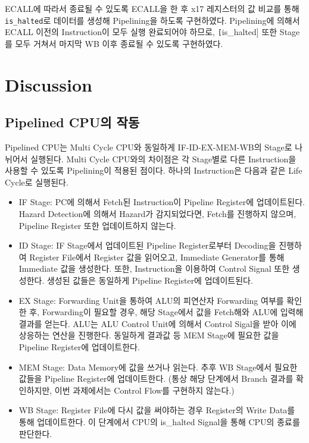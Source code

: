 \documentclass[openright, a4paper]{article}
\newcommand{\code}[1]{\texttt{#1}}
\begin{document}
ECALL에 따라서 종료될 수 있도록 ECALL을 한 후 x17 레지스터의 값 비교를 통해 \code{is_halted}로 데이터를 생성해 Pipelining을 하도록 구현하였다. Pipelining에 의해서 ECALL 이전의 Instruction이 모두 실행 완료되어야 하므로, \code[is_halted] 또한 Stage를 모두 거쳐서 마지막 WB 이후 종료될 수 있도록 구현하였다.


\section{Discussion}

\subsection{Pipelined CPU의 작동}

Pipelined CPU는 Multi Cycle CPU와 동일하게 IF-ID-EX-MEM-WB의 Stage로 나뉘어서 실행된다. Multi Cycle CPU와의 차이점은 각 Stage별로 다른 Instruction을 사용할 수 있도록 Pipelining이 적용된 점이다. 하나의 Instruction은 다음과 같은 Life Cycle로 실행된다.

\begin{itemize}
    \item IF Stage: PC에 의해서 Fetch된 Instruction이 Pipeline Register에 업데이트된다. Hazard Detection에 의해서 Hazard가 감지되었다면, Fetch를 진행하지 않으며, Pipeline Register 또한 업데이트하지 않는다.
    
    \item ID Stage: IF Stage에서 업데이트된 Pipeline Register로부터 Decoding을 진행하여 Register File에서 Register 값을 읽어오고, Immediate Generator를 통해 Immediate 값을 생성한다. 또한, Instruction을 이용하여 Control Signal 또한 생성한다. 생성된 값들은 동일하게 Pipeline Register에 업데이트된다.
    
    \item EX Stage: Forwarding Unit을 통하여 ALU의 피연산자 Forwarding 여부를 확인한 후, Forwarding이 필요할 경우, 해당 Stage에서 값을 Fetch해와 ALU에 입력해 결과를 얻는다. ALU는 ALU Control Unit에 의해서 Control Sigal을 받아 이에 상응하는 연산을 진행한다. 동일하게 결과값 등 MEM Stage에 필요한 값을 Pipeline Register에 업데이트한다.

    \item MEM Stage: Data Memory에 값을 쓰거나 읽는다. 추후 WB Stage에서 필요한 값들을 Pipeline Register에 업데이트한다. (통상 해당 단계에서 Branch 결과를 확인하지만, 이번 과제에서는 Control Flow를 구현하지 않는다.)

    \item WB Stage: Register File에 다시 값을 써야하는 경우 Register의 Write Data를 통해 업데이트한다. 이 단계에서 CPU의 is_halted Signal을 통해 CPU의 종료를 판단한다.
\end{itemize}
\end{document}
